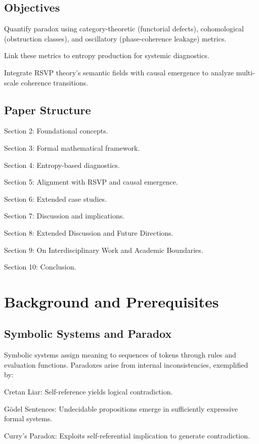 \documentclass[12pt]{article}
\theoremstyle{plain}
\begin{document}
\subsection{Objectives}

Quantify paradox using category-theoretic (functorial defects), cohomological (obstruction classes), and oscillatory (phase-coherence leakage) metrics.

Link these metrics to entropy production for systemic diagnostics.

Integrate RSVP theory’s semantic fields with causal emergence to analyze multi-scale coherence transitions.

\subsection{Paper Structure}

Section 2: Foundational concepts.

Section 3: Formal mathematical framework.

Section 4: Entropy-based diagnostics.

Section 5: Alignment with RSVP and causal emergence.

Section 6: Extended case studies.

Section 7: Discussion and implications.

Section 8: Extended Discussion and Future Directions.

Section 9: On Interdisciplinary Work and Academic Boundaries.

Section 10: Conclusion.

\section{Background and Prerequisites}

\subsection{Symbolic Systems and Paradox}

Symbolic systems assign meaning to sequences of tokens through rules and evaluation functions. Paradoxes arise from internal inconsistencies, exemplified by:

Cretan Liar: Self-reference yields logical contradiction.

Gödel Sentences: Undecidable propositions emerge in sufficiently expressive formal systems.

Curry’s Paradox: Exploits self-referential implication to generate contradiction.
\end{document}

